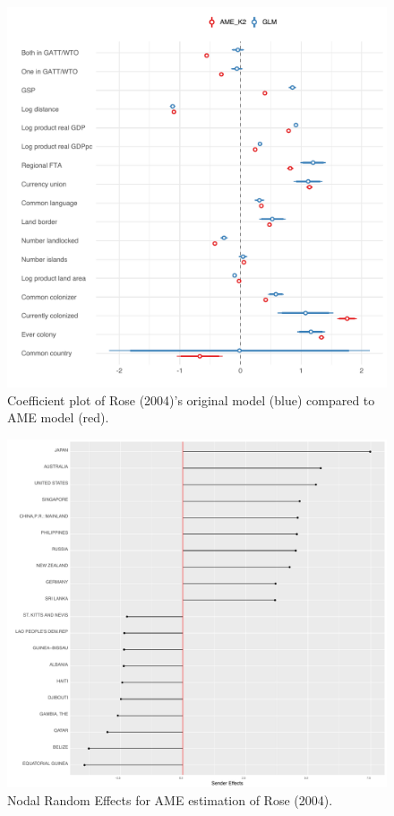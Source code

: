 \documentclass[12pt]{amsart}
\begin{document}
\begin{figure}
\includegraphics[width=\textwidth]{rose_coefs_all_final.pdf}
 \caption{Coefficient plot of Rose (2004)'s original model (blue) compared to AME model (red).}\label{fig:roseCoef}
\end{figure}


\begin{figure}
\includegraphics[width=\textwidth]{ABplot_rose_top10.pdf}
 \caption{Nodal Random Effects for AME estimation of Rose (2004).}\label{fig:roser}
\end{figure}
\end{document}
